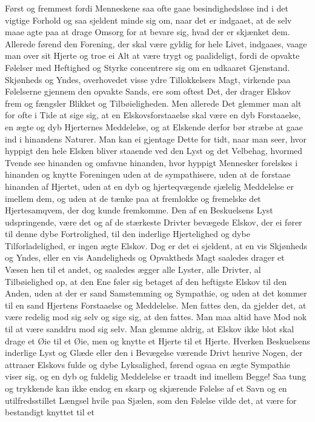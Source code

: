\documentclass[12pt,a4paper]{book}
\newcommand{\apage}[1]{\marginnote{\footnotesize\textit{[#1]}}}
\begin{document}
Først og fremmest fordi Menneskene saa ofte gaae besindighedsløse ind i
det vigtige Forhold og saa sjeldent minde sig om, naar det er indgaaet,
at de selv maae agte paa at drage Omsorg for at bevare sig, hvad der er
skjænket dem. Allerede førend den Forening, der skal være gyldig for
hele Livet, indgaaes, vaage man over sit Hjerte og troe ei Alt at være
trygt og paalideligt, fordi de opvakte Følelser med Heftighed og Styrke
concentrere sig om en udkaaret Gjenstand. Skjønheds og Yndes,
overhovedet visse ydre Tillokkelsers Magt, virkende paa Følelserne
gjennem den opvakte Sands, ere som oftest Det, der drager Elskov frem og
fængsler Blikket og Tilbøieligheden. Men allerede Det glemmer man alt
for ofte i Tide at sige sig, at en Elskovsforstaaelse skal være en dyb
Forstaaelse, en ægte og dyb Hjerternes Meddelelse, og at Elskende derfor
bør stræbe at gaae ind i hinandens Naturer. Man kan ei gjentage Dette
for tidt, naar man seer, hvor hyppigt den hele Elsken bliver staaende
ved den Lyst og det Velbehag, hvormed Tvende see hinanden og omfavne
hinanden, hvor hyppigt Mennesker forelskes i hinanden og knytte
Foreningen uden at de sympathisere, uden at de forstaae hinanden af
Hjertet, uden at en dyb og hjerteqvægende sjælelig Meddelelse er imellem
dem, og uden at de tænke paa at fremlokke og fremelske det
Hjertesamqvem, der dog kunde fremkomme. Den af en Beskuelsens Lyst
udspringende, være det og af de stærkeste \apage{72} Drivter bevægede Elskov, der
ei fører til denne dybe Fortrolighed, til den inderlige Hjertelighed og
dybe Tilforladelighed, er ingen ægte Elskov. Dog er det ei sjeldent, at
en vis Skjønheds og Yndes, eller en vis Aandeligheds og Opvaktheds Magt
saaledes drager et Væsen hen til et andet, og saaledes ægger alle
Lyster, alle Drivter, al Tilbøielighed op, at den Ene føler sig betaget
af den heftigste Elskov til den Anden, uden at der er sand Samstemming
og Sympathie, og uden at det kommer til en sand Hjertens Forstaaelse og
Meddelelse. Men fattes den, da gjelder det, at være redelig mod sig selv
og sige sig, at den fattes. Man maa altid have Mod nok til at være
sanddru mod sig selv. Man glemme aldrig, at Elskov ikke blot skal drage
et Øie til et Øie, men og knytte et Hjerte til et Hjerte. Hverken
Beskuelsens inderlige Lyst og Glæde eller den i Bevægelse værende Drivt
henrive Nogen, der attraaer Elskovs fulde og dybe Lyksalighed, førend
ogsaa en ægte Sympathie viser sig, og en dyb og fuldelig Meddelelse er
traadt ind imellem Begge! Saa tung og trykkende kan ikke endog en skarp
og skjærende Følelse af et Savn og en utilfredsstillet Længsel hvile paa
Sjælen, som den Følelse vilde det, at være for bestandigt knyttet til et
\end{document}
